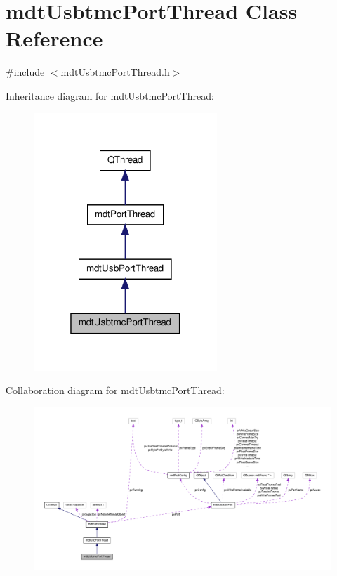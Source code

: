 \hypertarget{classmdt_usbtmc_port_thread}{\section{mdt\-Usbtmc\-Port\-Thread Class Reference}
\label{classmdt_usbtmc_port_thread}
}


{\ttfamily \#include $<$mdt\-Usbtmc\-Port\-Thread.\-h$>$}



Inheritance diagram for mdt\-Usbtmc\-Port\-Thread\-:\nopagebreak
\begin{figure}[H]
\begin{center}
\leavevmode
\includegraphics[width=196pt]{classmdt_usbtmc_port_thread__inherit__graph}
\end{center}
\end{figure}


Collaboration diagram for mdt\-Usbtmc\-Port\-Thread\-:\nopagebreak
\begin{figure}[H]
\begin{center}
\leavevmode
\includegraphics[width=350pt]{classmdt_usbtmc_port_thread__coll__graph}
\end{center}
\end{figure}
